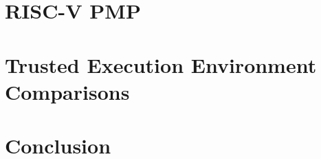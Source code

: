 \documentclass[12pt,oneside,letterpaper,hidelinks]{PSUreport}
\begin{document}
\glsresetall
\chapter{RISC-V PMP}
\label{chap:pmp}


\glsresetall
\chapter{Trusted Execution Environment Comparisons}
\label{chap:comp}


\glsresetall
\chapter{Conclusion}
\label{chap:fini}




\end{document}
